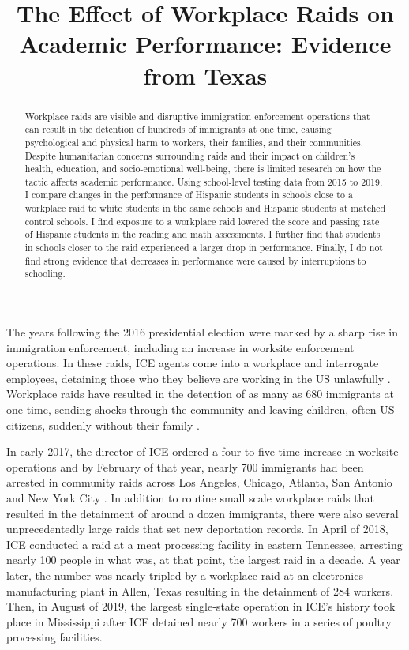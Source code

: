 \documentclass[hidelinks,twoside]{article}
\date{}
\begin{document}
\title{\headingfont \singlespacing \textbf{The Effect of Workplace Raids on Academic Performance: Evidence from Texas}}
\author{}
\maketitle\vspace{-10ex}
\begin{abstract}
\singlespacing
 \noindent Workplace raids are visible and disruptive immigration enforcement operations that can result in the detention of hundreds of immigrants at one time, causing psychological and physical harm to workers, their families, and their communities. Despite humanitarian concerns surrounding raids and their impact on children's health, education, and socio-emotional well-being, there is limited research on how the tactic affects academic performance. Using school-level testing data from 2015 to 2019, I compare changes in the performance of Hispanic students in schools close to a workplace raid to white students in the same schools and Hispanic students at matched control schools. I find exposure to a workplace raid lowered the score and passing rate of Hispanic students in the reading and math assessments. I further find that students in schools closer to the raid experienced a larger drop in performance. Finally, I do not find strong evidence that decreases in performance were caused by interruptions to schooling.
\end{abstract}
\vspace{2ex}


\noindent The years following the 2016 presidential election were marked by a sharp rise in immigration enforcement, including an increase in worksite enforcement operations. In these raids, ICE agents come into a workplace and interrogate employees, detaining those who they believe are working in the US unlawfully \citep{law_2020_worksite}. Workplace raids have resulted in the detention of as many as 680 immigrants at one time, sending shocks through the community and leaving children, often US citizens, suddenly without their family \citep{bethea_2019_after}. 

In early 2017, the director of ICE ordered a four to five time increase in worksite operations and by February of that year, nearly 700 immigrants had been arrested in community raids across Los Angeles, Chicago, Atlanta, San Antonio and New York City \citep{kim_2017_trump}. In addition to routine small scale workplace raids that resulted in the detainment of around a dozen immigrants, there were also several unprecedentedly large raids that set new deportation records. In April of 2018, ICE conducted a raid at a meat processing facility in eastern Tennessee, arresting nearly 100 people in what was, at that point, the largest raid in a decade. A year later, the number was nearly tripled by a workplace raid at an electronics manufacturing plant in Allen, Texas resulting in the detainment of 284 workers. Then, in August of 2019, the largest single-state operation in ICE’s history took place in Mississippi after ICE detained nearly 700 workers in a series of poultry processing facilities. 
\end{document}

